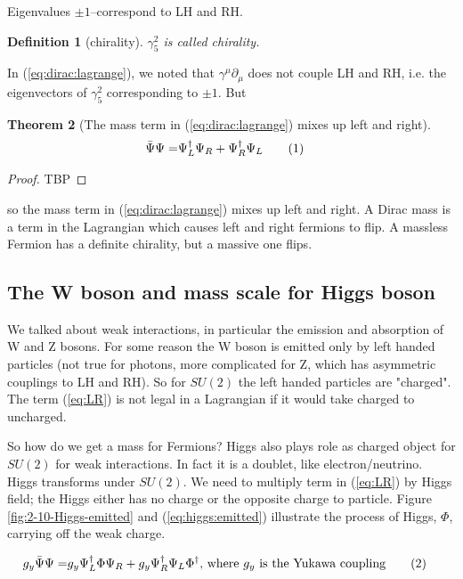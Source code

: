 \documentclass[]{article}
\newcommand\numberthis{\addtocounter{equation}{1}\tag{\theequation}}
\newtheorem{thm}{Theorem}
\newtheorem{defn}[thm]{Definition}
\begin{document}
Eigenvalues $\pm 1$--correspond to LH and RH.

\begin{defn}[chirality]
	$\gamma_5^2$ is called chirality.
\end{defn}

In (\ref{eq:dirac:lagrange}), we noted that $\gamma^\mu \partial_\mu$  does not couple LH and RH, i.e. the eigenvectors of $\gamma_5^2$ corresponding to $\pm 1$. But

\begin{thm}[The mass term in  (\ref{eq:dirac:lagrange}) mixes up left and right]
	\begin{align*}
		\bar{\Psi}\Psi =& \Psi^\dagger_L \Psi_R + \Psi^\dagger_R \Psi_L \numberthis \label{eq:LR}
	\end{align*}
\end{thm}
\begin{proof}
	TBP
\end{proof}

so the mass term in  (\ref{eq:dirac:lagrange}) mixes up left and right. A Dirac mass is a term in the Lagrangian which causes left and right fermions to flip. A massless Fermion has a definite chirality, but a massive one flips.

\subsection{The W boson and mass scale for Higgs boson}

We talked about weak interactions, in particular the emission and absorption of W and Z bosons. For some reason the W boson is emitted only by left handed particles (not true for photons, more complicated for Z, which has asymmetric couplings to LH and RH). So for $SU(2)$ the left handed particles are "charged". The term (\ref{eq:LR}) is not legal in a Lagrangian if it would take charged to uncharged.

So how do we get a mass for Fermions? Higgs also plays role as charged object for $SU(2)$ for weak interactions. In fact it is a doublet, like electron/neutrino. Higgs transforms under $SU(2)$. We need to multiply term in (\ref{eq:LR}) by Higgs field; the Higgs either has no charge or the opposite charge to particle. Figure \ref{fig:2-10-Higgs-emitted} and (\ref{eq:higgs:emitted}) illustrate the process of Higgs, $\Phi$, carrying off the weak charge.

\begin{align*}
	g_y \bar{\Psi}\Psi =& g_y \Psi^\dagger_L \Phi \Psi_R + g_y \Psi^\dagger_R \Psi_L \Phi^\dagger \text{, where $g_y$ is the Yukawa coupling} \numberthis \label{eq:higgs:emitted}
\end{align*}
\end{document}

